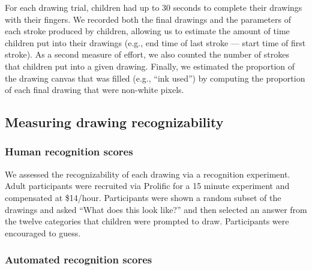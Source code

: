 \documentclass[
  english,
  man]{apa6}
\begin{document}
For each drawing trial, children had up to 30 seconds to complete their drawings with their fingers. We recorded both the final drawings and the parameters of each stroke produced by children, allowing us to estimate the amount of time children put into their drawings (e.g., end time of last stroke --- start time of first stroke). As a second measure of effort, we also counted the number of strokes that children put into a given drawing. Finally, we estimated the proportion of the drawing canvas that was filled (e.g., \enquote{ink used}) by computing the proportion of each final drawing that were non-white pixels.

\hypertarget{measuring-drawing-recognizability}{%
\subsection{Measuring drawing recognizability}\label{measuring-drawing-recognizability}}

\hypertarget{human-recognition-scores}{%
\subsubsection{Human recognition scores}\label{human-recognition-scores}}

We assessed the recognizability of each drawing via a recognition experiment. Adult participants were recruited via Prolific for a 15 minute experiment and compensated at \$14/hour. Participants were shown a random subset of the drawings and asked \enquote{What does this look like?} and then selected an answer from the twelve categories that children were prompted to draw. Participants were encouraged to guess.

\hypertarget{automated-recognition-scores}{%
\subsubsection{Automated recognition scores}\label{automated-recognition-scores}}
\end{document}
